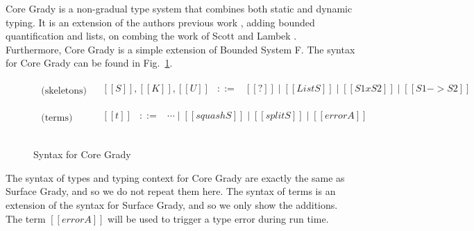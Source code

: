 Core Grady is a non-gradual type system that combines both static and
dynamic typing.  It is an extension of the authors previous work
\cite{Eades:2017}, adding bounded quantification and lists, on combing
the work of Scott \cite{Scott:1980} and Lambek \cite{Lambek:1988}.
Furthermore, Core Grady is a simple extension of Bounded System F.
The syntax for Core Grady can be found in
Fig.~\ref{fig:syntax-core-grady}.
\begin{figure}
    \small
  \begin{mdframed}
      \[
      \begin{array}{cl}
        \begin{array}{l}
          \text{(skeletons)}
        \end{array}     &
        \begin{array}{lcl}
          [[S]], [[K]], [[U]] & ::= & [[?]] \mid [[List S]] \mid [[S1 x S2]] \mid [[S1 -> S2]]\\
        \end{array}\\\\
                
        \begin{array}{l}
          \text{(terms)}
        \end{array}     &
        \begin{array}{lcl}
          [[t]] & ::= & \cdots \mid [[squash S]] \mid [[split S]] \mid [[error A]]\\
        \end{array}\\\\        
      \end{array}
      \]    
  \end{mdframed}
  \caption{Syntax for Core Grady}
  \label{fig:syntax-core-grady}
\end{figure}
The syntax of types and typing context for Core Grady are exactly the
same as Surface Grady, and so we do not repeat them here.  The syntax
of terms is an extension of the syntax for Surface Grady, and so we
only show the additions.  The term $[[error A]]$ will be used to
trigger a type error during run time.

